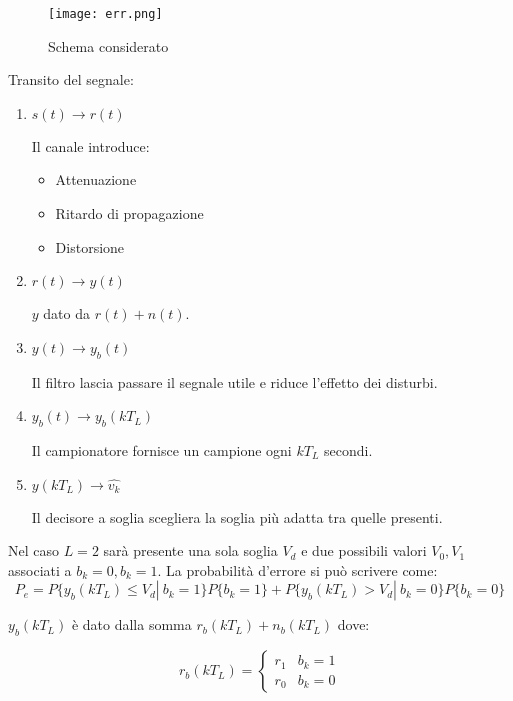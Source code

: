 \documentclass{article}
\begin{document}
\begin{figure}[ht]
    \centering
    \texttt{[image: err.png]}
    \caption{Schema considerato}
\end{figure}

\noindent Transito del segnale:
\begin{enumerate}
    \item $s(t)\rightarrow r(t)$

        Il canale introduce:
            \begin{itemize}
                \item Attenuazione
                \item Ritardo di propagazione
                \item Distorsione
            \end{itemize}

    \item $r(t)\rightarrow y(t)$

    $y$ dato da $r(t)+n(t)$.

    \item $y(t)\rightarrow y_b(t)$

        Il filtro lascia passare il segnale utile e riduce l'effetto dei disturbi.

    \item $y_b(t)\rightarrow y_b(kT_L)$

        Il campionatore fornisce un campione ogni $kT_L$ secondi.

    \item $y(kT_L)\rightarrow \hat{v_k}$

        Il decisore a soglia scegliera la soglia più adatta tra quelle presenti.\newline
    
\end{enumerate}

\noindent Nel caso $L=2$ sarà presente una sola soglia $V_d$ e due possibili valori $V_0,V_1$ associati a $b_k=0,b_k=1$. La probabilità d'errore si può scrivere come:
$$P_e=P\{y_b(kT_L)\leq V_d|\ b_k=1\}P\{b_k=1\}+P\{y_b(kT_L)>V_d|\ b_k=0\}P\{b_k=0\}$$\newline

\noindent $y_b(kT_L)$ è dato dalla somma $r_b(kT_L)+n_b(kT_L)$ dove:

\[r_b(kT_L)=\begin{cases}
    r_1 & b_k=1\\
    r_0 & b_k=0
\end{cases}\]
\end{document}
